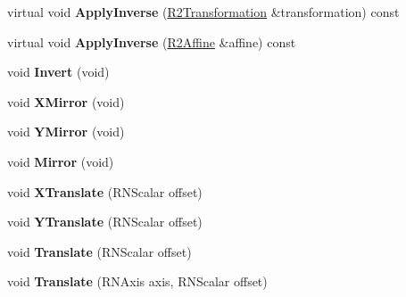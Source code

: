 \begin{DoxyCompactItemize}
\item 
virtual void {\bfseries Apply\+Inverse} (\hyperlink{class_r2_transformation}{R2\+Transformation} \&transformation) const \hypertarget{class_r2_affine_a5f8021caca86ddd9034ed7bedd89b2cd}{}\label{class_r2_affine_a5f8021caca86ddd9034ed7bedd89b2cd}

\item 
virtual void {\bfseries Apply\+Inverse} (\hyperlink{class_r2_affine}{R2\+Affine} \&affine) const \hypertarget{class_r2_affine_a06d1c85e5a4177c2827d79eda52df5ee}{}\label{class_r2_affine_a06d1c85e5a4177c2827d79eda52df5ee}

\item 
void {\bfseries Invert} (void)\hypertarget{class_r2_affine_a1c959561b4bc706af845eb8b6f4698e3}{}\label{class_r2_affine_a1c959561b4bc706af845eb8b6f4698e3}

\item 
void {\bfseries X\+Mirror} (void)\hypertarget{class_r2_affine_afc27d2ee78fe58acabd5ac058f037d65}{}\label{class_r2_affine_afc27d2ee78fe58acabd5ac058f037d65}

\item 
void {\bfseries Y\+Mirror} (void)\hypertarget{class_r2_affine_a6b501f99a429ec69b810a51aabc83192}{}\label{class_r2_affine_a6b501f99a429ec69b810a51aabc83192}

\item 
void {\bfseries Mirror} (void)\hypertarget{class_r2_affine_a0e879272c3e6a66b9697a5fa0c9fc7bf}{}\label{class_r2_affine_a0e879272c3e6a66b9697a5fa0c9fc7bf}

\item 
void {\bfseries X\+Translate} (R\+N\+Scalar offset)\hypertarget{class_r2_affine_ae1fdddcd927c8060e9304df4aebfec5a}{}\label{class_r2_affine_ae1fdddcd927c8060e9304df4aebfec5a}

\item 
void {\bfseries Y\+Translate} (R\+N\+Scalar offset)\hypertarget{class_r2_affine_af2d90c14c26e4aa4fbdb957e9ff587e5}{}\label{class_r2_affine_af2d90c14c26e4aa4fbdb957e9ff587e5}

\item 
void {\bfseries Translate} (R\+N\+Scalar offset)\hypertarget{class_r2_affine_a260110e1dc7228b0b9b2b5589c1a85b6}{}\label{class_r2_affine_a260110e1dc7228b0b9b2b5589c1a85b6}

\item 
void {\bfseries Translate} (R\+N\+Axis axis, R\+N\+Scalar offset)\hypertarget{class_r2_affine_a7beb5fd439b6d0effb5acac80bfcc8df}{}\label{class_r2_affine_a7beb5fd439b6d0effb5acac80bfcc8df}


\end{DoxyCompactItemize}
